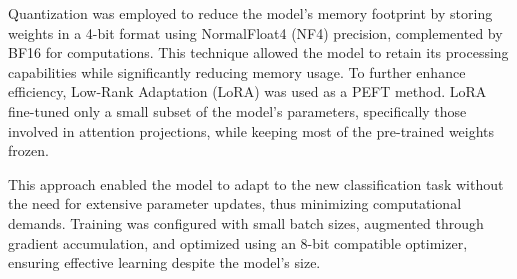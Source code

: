 \documentclass{Configuration_Files/PoliMi3i_thesis}
\begin{document}
Quantization was employed to reduce the model's memory footprint by storing weights in a 4-bit format using NormalFloat4 (NF4) precision, complemented by BF16 for computations. This technique allowed the model to retain its processing capabilities while significantly reducing memory usage. To further enhance efficiency, Low-Rank Adaptation (LoRA) \cite{hulora} was used as a PEFT method. LoRA fine-tuned only a small subset of the model’s parameters, specifically those involved in attention projections, while keeping most of the pre-trained weights frozen. 

This approach enabled the model to adapt to the new classification task without the need for extensive parameter updates, thus minimizing computational demands.
Training was configured with small batch sizes, augmented through gradient accumulation, and optimized using an 8-bit compatible optimizer, ensuring effective learning despite the model's size.
\end{document}
